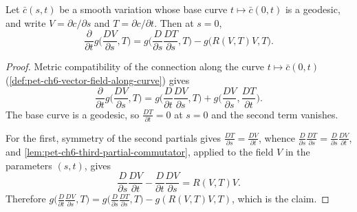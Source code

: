 \begin{lemma}
  \label{lem:pet-ch6-second-variation-integrand}
  \leanok
  Let $\bar c(s,t)$ be a smooth variation whose base curve $t\mapsto\bar c(0,t)$ is
  a geodesic, and write $V=\partial c/\partial s$ and $T=\partial c/\partial t$.
  Then at $s=0$,
  \[
    \frac{\partial}{\partial t}g\Big(\frac{DV}{\partial s},T\Big)
      =g\Big(\frac{D}{\partial s}\frac{DT}{\partial s},T\Big)-g\big(R(V,T)V,T\big).
  \]
\end{lemma}
\begin{proof}
  Metric compatibility of the connection along the curve $t\mapsto\bar c(0,t)$
  (\cref{def:pet-ch6-vector-field-along-curve}) gives
  \[
    \frac{\partial}{\partial t}g\Big(\frac{DV}{\partial s},T\Big)
      =g\Big(\frac{D}{\partial t}\frac{DV}{\partial s},T\Big)
       +g\Big(\frac{DV}{\partial s},\frac{DT}{\partial t}\Big).
  \]
  The base curve is a geodesic, so $\frac{DT}{\partial t}=0$ at $s=0$ and the
  second term vanishes.

  For the first, symmetry of the second partials gives
  $\frac{DT}{\partial s}=\frac{DV}{\partial t}$, whence
  $\frac{D}{\partial s}\frac{DT}{\partial s}=\frac{D}{\partial s}\frac{DV}{\partial t}$,
  and \cref{lem:pet-ch6-third-partial-commutator}, applied to the field $V$ in the
  parameters $(s,t)$, gives
  \[
    \frac{D}{\partial s}\frac{DV}{\partial t}-\frac{D}{\partial t}\frac{DV}{\partial s}
      =R(V,T)V.
  \]
  Therefore
  $g\big(\frac{D}{\partial t}\frac{DV}{\partial s},T\big)
    =g\big(\frac{D}{\partial s}\frac{DT}{\partial s},T\big)-g(R(V,T)V,T)$,
  which is the claim.
\end{proof}


